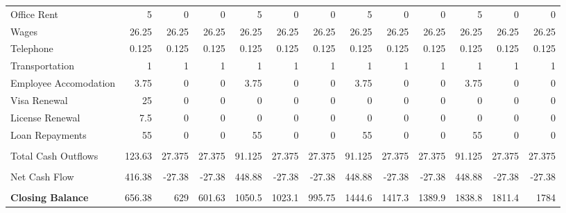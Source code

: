 \begin{table}[htbp]
\begin{tabular}{|l|r|r|r|r|r|r|r|r|r|r|r|r|}
    \midrule
          &       &       &       &       &       &       &       &       &       &       &       &  \\
    \midrule
    Office Rent  & 5     & 0     & 0     & 5     & 0     & 0     & 5     & 0     & 0     & 5     & 0     & 0 \\
    \midrule
    Wages & 26.25 & 26.25 & 26.25 & 26.25 & 26.25 & 26.25 & 26.25 & 26.25 & 26.25 & 26.25 & 26.25 & 26.25 \\
    \midrule
    Telephone & 0.125 & 0.125 & 0.125 & 0.125 & 0.125 & 0.125 & 0.125 & 0.125 & 0.125 & 0.125 & 0.125 & 0.125 \\
    \midrule
    Transportation & 1     & 1     & 1     & 1     & 1     & 1     & 1     & 1     & 1     & 1     & 1     & 1 \\
    \midrule
    Employee Accomodation & 3.75  & 0     & 0     & 3.75  & 0     & 0     & 3.75  & 0     & 0     & 3.75  & 0     & 0 \\
    \midrule
    Visa Renewal & 25    & 0     & 0     & 0     & 0     & 0     & 0     & 0     & 0     & 0     & 0     & 0 \\
    \midrule
    License Renewal & 7.5   & 0     & 0     & 0     & 0     & 0     & 0     & 0     & 0     & 0     & 0     & 0 \\
    \midrule
    Loan Repayments & 55    & 0     & 0     & 55    & 0     & 0     & 55    & 0     & 0     & 55    & 0     & 0 \\
    \midrule
          &       &       &       &       &       &       &       &       &       &       &       &  \\
    \midrule
    Total Cash Outflows & 123.63 & 27.375 & 27.375 & 91.125 & 27.375 & 27.375 & 91.125 & 27.375 & 27.375 & 91.125 & 27.375 & 27.375 \\
    \midrule
          &       &       &       &       &       &       &       &       &       &       &       &  \\
    \midrule
    Net Cash Flow & 416.38 & -27.38 & -27.38 & 448.88 & -27.38 & -27.38 & 448.88 & -27.38 & -27.38 & 448.88 & -27.38 & -27.38 \\
    \midrule
          &       &       &       &       &       &       &       &       &       &       &       &  \\
    \midrule
    \textbf{Closing Balance} & 656.38 & 629   & 601.63 & 1050.5 & 1023.1 & 995.75 & 1444.6 & 1417.3 & 1389.9 & 1838.8 & 1811.4 & 1784 \\
    \bottomrule
    \end{tabular}%
  \label{tab:addlabel}%
\end{table}%


